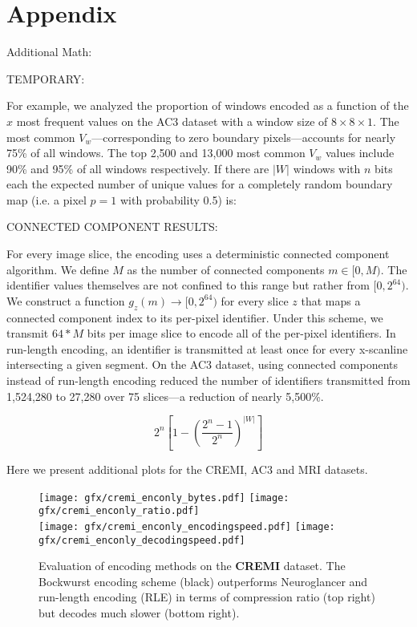 \section{Appendix} \label{sec:appendix}

Additional Math:

TEMPORARY:

For example, we analyzed the proportion of windows encoded as a function of the $x$ most frequent values on the AC3 dataset with a window size of $8 \times 8 \times 1$. The most common $V_w$---corresponding to zero boundary pixels---accounts for nearly 75\% of all windows. The top 2,500 and 13,000 most common $V_w$ values include 90\% and 95\% of all windows respectively. If there are $|W|$ windows with $n$ bits each the expected number of unique values for a completely random boundary map (i.e. a pixel $p = 1$ with probability 0.5) is:

CONNECTED COMPONENT RESULTS:

For every image slice, the encoding uses a deterministic connected component algorithm. 
We define $M$ as the number of connected components $m \in [0, M)$. 
The identifier values themselves are not confined to this range but rather from $[0, 2^{64})$. 
We construct a function $g_z(m) \to [0, 2^{64})$ for every slice $z$ that maps a connected component index to its per-pixel identifier. 
Under this scheme, we transmit $64 * M$ bits per image slice to encode all of the per-pixel identifiers. 
In run-length encoding, an identifier is transmitted at least once for every x-scanline intersecting a given segment. 
On the AC3 dataset, using connected components instead of run-length encoding reduced the number of identifiers transmitted from 1,524,280 to 27,280 over 75 slices---a reduction of nearly 5,500\%. 







\begin{equation}
2^{n}\left[1 - \left(\frac{2^{n} - 1}{2^{n}}\right)^{|W|}\right]
\end{equation} 


Here we present additional plots for the CREMI, AC3 and MRI datasets.

%
%
%
\begin{figure}[h]
\texttt{[image: gfx/cremi\_enconly\_bytes.pdf]}%
\texttt{[image: gfx/cremi\_enconly\_ratio.pdf]}%
\\
\texttt{[image: gfx/cremi\_enconly\_encodingspeed.pdf]}%
\texttt{[image: gfx/cremi\_enconly\_decodingspeed.pdf]}%
\caption{Evaluation of encoding methods on the \textbf{CREMI} dataset. The Bockwurst encoding scheme (black) outperforms Neuroglancer and run-length encoding (RLE) in terms of compression ratio (top right) but decodes much slower (bottom right).}
\label{fig:cremi_encoding_results}
\end{figure}


